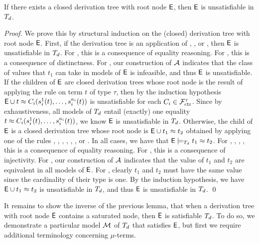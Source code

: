\begin{lemma}%
\label{lem:rs}%
\afterDot
If there exists a closed derivation tree with root node $\mathsf{E}$, then $\mathsf{E}$ is unsatisfiable in $T_{d}$.
\end{lemma}
\begin{proof}
We prove this by structural induction on the (closed) derivation tree with root node $\mathsf{E}$.
First, if the derivation tree is an application of , , or ,
then $\mathsf{E}$ is unsatisfiable in $T_{d}$.
For , this is a consequence of equality reasoning.
For , this is a consequence of distinctness.
For , our construction of $\mathcal{A}$ indicates that the class of values that $t_1$ can take in models of $\mathsf{E}$ is infeasible,
and thus $\mathsf{E}$ is unsatisfiable.
If the children of $\mathsf{E}$ are closed derivation trees 
whose root node is the result of applying the rule  on term $t$ of type $\tau$,
then by the induction hypothesis $\mathsf{E} \cup t \approx C_i( s^1_i( t ), \ldots, s^{a_i}_i( t ) )$ is unsatisfiable
for each $C_i \in \mathcal{F}_{\mathrm{ctr}}^\tau$.
Since by exhaustiveness, all models of $T_{d}$ entail (exactly) one equality $t \approx C_i( s^1_i( t ), \ldots, s^{a_i}_i( t ) )$,
we know $\mathsf{E}$ is unsatisfiable in $T_{d}$.
Otherwise, the child of $\mathsf{E}$ is a closed derivation tree 
whose root node is $\mathsf{E} \cup t_1 \approx t_2$ obtained by applying one of the rules , , , , , , or .
In all cases, we have that $\mathsf{E} \models_{T_{d}} t_1 \approx t_2$.
For , , , , this is a consequence of equality reasoning.
For , this is a consequence of injectivity.
For , our construction of $\mathcal{A}$ indicates that the value of $t_1$ and $t_2$ are equivalent in all models of $\mathsf{E}$.
For , clearly $t_1$ and $t_2$ must have the same value since the cardinality of their type is one.
By the induction hypothesis, we have $\mathsf{E} \cup t_1 \approx t_2$ is unsatisfiable in $T_{d}$, 
and thus $\mathsf{E}$ is unsatisfiable in $T_{d}$.
\qed
\end{proof}

It remains to show the inverse of the previous lemma, that when a derivation tree with root node $\mathsf{E}$ contains a saturated node,
then $\mathsf{E}$ is satisfiable $T_{d}$.
To do so, we demonstrate a particular model $\mathcal{M}$ of $T_{d}$ that satisfies $\mathsf{E}$,
but first we require additional terminology concerning $\mu$-terms.

